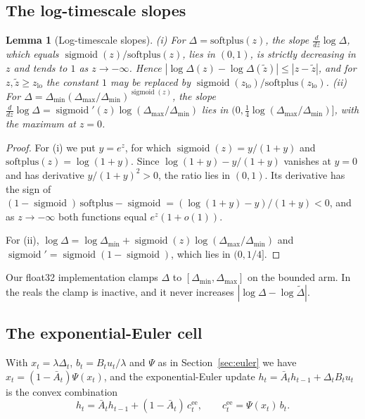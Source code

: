 \documentclass[11pt, a4paper]{article}
\newtheorem{lemma}[proposition]{Lemma}
\theoremstyle{remark}
\theoremstyle{plain}
\newcommand{\Abar}{\bar{A}}
\begin{document}
\subsection{The log-timescale slopes}

\begin{lemma}[Log-timescale slopes]
\label{lem:param}
(i) For $\Delta = \mathrm{softplus}(z)$, the slope $\frac{d}{dz}\log\Delta$, which equals
$\operatorname{sigmoid}(z)/\mathrm{softplus}(z)$, lies in $(0, 1)$, is strictly decreasing in $z$
and tends to $1$ as $z \to -\infty$. Hence $|\log\Delta(z) - \log\Delta(\tilde z)| \le
|z - \tilde z|$, and for $z, \tilde z \ge z_{\mathrm{lo}}$ the constant $1$ may be replaced by
$\operatorname{sigmoid}(z_{\mathrm{lo}})/\mathrm{softplus}(z_{\mathrm{lo}})$.
(ii) For $\Delta = \Delta_{\min}(\Delta_{\max}/\Delta_{\min})^{\operatorname{sigmoid}(z)}$, the
slope $\frac{d}{dz}\log\Delta = \operatorname{sigmoid}'(z)\log(\Delta_{\max}/\Delta_{\min})$ lies
in $(0, \tfrac{1}{4}\log(\Delta_{\max}/\Delta_{\min})]$, with the maximum at $z = 0$.
\end{lemma}

\begin{proof}
For (i) we put $y = e^{z}$, for which $\operatorname{sigmoid}(z) = y/(1 + y)$ and
$\mathrm{softplus}(z) = \log(1 + y)$. Since $\log(1 + y) - y/(1 + y)$ vanishes at $y = 0$ and has
derivative $y/(1 + y)^2 > 0$, the ratio lies in $(0, 1)$. Its derivative has the sign of
$(1 - \operatorname{sigmoid})\,\mathrm{softplus} - \operatorname{sigmoid} =
(\log(1 + y) - y)/(1 + y) < 0$, and as $z \to -\infty$ both functions equal $e^{z}(1 + o(1))$.

For (ii), $\log\Delta = \log\Delta_{\min} + \operatorname{sigmoid}(z)\log(\Delta_{\max}/\Delta_{\min})$
and $\operatorname{sigmoid}' = \operatorname{sigmoid}(1 - \operatorname{sigmoid})$, which lies in
$(0, 1/4]$.
\end{proof}

Our float32 implementation clamps $\Delta$ to $[\Delta_{\min}, \Delta_{\max}]$ on the bounded
arm. In the reals the clamp is inactive, and it never increases $|\log\Delta - \log\tilde\Delta|$.

\subsection{The exponential-Euler cell}

With $x_t = \lambda\Delta_t$, $b_t = B_t u_t/\lambda$ and $\Psi$ as in Section~\ref{sec:euler} we
have $x_t = (1 - \Abar_t)\Psi(x_t)$, and the exponential-Euler
update $h_t = \Abar_t h_{t-1} + \Delta_t B_t u_t$ is the convex combination
\[
  h_t = \Abar_t h_{t-1} + (1 - \Abar_t)\, c^{\mathrm{ee}}_t,
  \qquad c^{\mathrm{ee}}_t = \Psi(x_t)\, b_t .
\]
\end{document}
